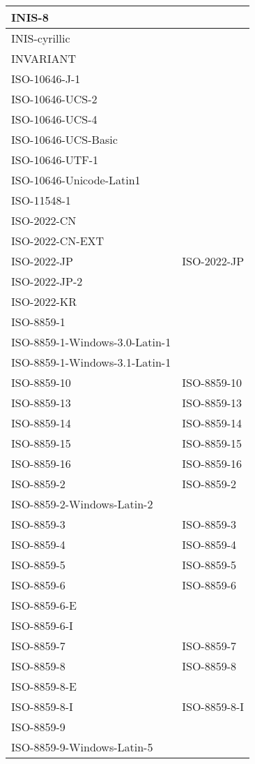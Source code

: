 \documentclass{wg21}
\begin{document}
\begin{longtable}{| p{} | p{} |}
INIS-8 & \\ \hline
INIS-cyrillic & \\ \hline
INVARIANT & \\ \hline
ISO-10646-J-1 & \\ \hline
ISO-10646-UCS-2 & \\ \hline
ISO-10646-UCS-4 & \\ \hline
ISO-10646-UCS-Basic & \\ \hline
ISO-10646-UTF-1 & \\ \hline
ISO-10646-Unicode-Latin1 & \\ \hline
ISO-11548-1 & \\ \hline
ISO-2022-CN & \\ \hline
ISO-2022-CN-EXT & \\ \hline
ISO-2022-JP & ISO-2022-JP\\ \hline
ISO-2022-JP-2 & \\ \hline
ISO-2022-KR & \\ \hline
ISO-8859-1 & \\ \hline
ISO-8859-1-Windows-3.0-Latin-1 & \\ \hline
ISO-8859-1-Windows-3.1-Latin-1 & \\ \hline
ISO-8859-10 & ISO-8859-10\\ \hline
ISO-8859-13 & ISO-8859-13\\ \hline
ISO-8859-14 & ISO-8859-14\\ \hline
ISO-8859-15 & ISO-8859-15\\ \hline
ISO-8859-16 & ISO-8859-16\\ \hline
ISO-8859-2 & ISO-8859-2\\ \hline
ISO-8859-2-Windows-Latin-2 & \\ \hline
ISO-8859-3 & ISO-8859-3\\ \hline
ISO-8859-4 & ISO-8859-4\\ \hline
ISO-8859-5 & ISO-8859-5\\ \hline
ISO-8859-6 & ISO-8859-6\\ \hline
ISO-8859-6-E & \\ \hline
ISO-8859-6-I & \\ \hline
ISO-8859-7 & ISO-8859-7\\ \hline
ISO-8859-8 & ISO-8859-8\\ \hline
ISO-8859-8-E & \\ \hline
ISO-8859-8-I & ISO-8859-8-I\\ \hline
ISO-8859-9 & \\ \hline
ISO-8859-9-Windows-Latin-5 & \\ \hline

\end{longtable}
\end{document}
